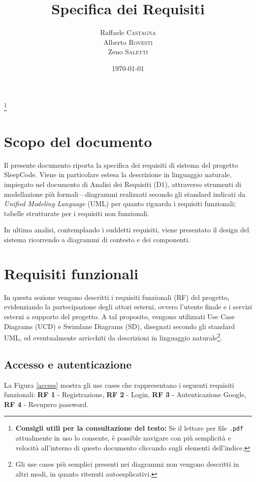 \documentclass[11pt, a4paper]{article}
\title{Specifica dei Requisiti}
\author{Raffaele \textsc{Castagna}\\
Alberto \textsc{Rovesti}\\
Zeno \textsc{Saletti}}
\date{\today}
\theoremstyle{definition} %
\newcommand\blfootnote[1]{%
  \begingroup
  \renewcommand\thefootnote{}\footnote{#1}%
  \addtocounter{footnote}{-1}%
  \endgroup
}
\begin{document}


\tableofcontents\blfootnote{\textbf{Consigli utili per la consultazione del testo:} Se il lettore per file \texttt{.pdf} attualmente in uso lo consente, è possible navigare con più semplicità e velocità all'interno di questo documento cliccando sugli elementi dell'indice.}

\afterpage{\cfoot{\thepage}}
\newpage
\section*{Scopo del documento}
Il presente documento riporta la specifica dei requisiti di sistema
del progetto SleepCode. Viene in particolare estesa la descrizione
in linguaggio naturale, impiegato nel documento di Analisi dei Requisiti
(D1), attraverso strumenti di modellazione più formali—diagrammi
realizzati secondo gli standard indicati da \textit{Unified Modeling Language}
(UML) per quanto riguarda i requisiti funzionali; tabelle strutturate
per i requisiti non funzionali.

In ultima analisi, contemplando i suddetti requisiti, viene presentato il
design del sistema ricorrendo a diagrammi di contesto e dei componenti.


\newpage
\section{Requisiti funzionali}
In questa sezione vengono descritti i requisiti funzionali (RF) del
progetto, evidenziando la partecipazione degli attori esterni, ovvero
l'utente finale e i servizi esterni a supporto del progetto. A tal
proposito, vengono utilizzati Use Case Diagrams (UCD) e Swimlane Diagrams (SD),
disegnati secondo gli standard UML, ed eventualmente arricchiti da
descrizioni in linguaggio naturale\footnote{Gli use cases più semplici
presenti nei diagrammi non vengono descritti in altri modi, in quanto ritenuti
autoesplicativi.}.

\subsection{Accesso e autenticazione}
La Figura \ref{access} mostra gli use cases che rappresentano i seguenti
requisiti funzionali: \textbf{RF 1} - Registrazione,
\textbf{RF 2} - Login, \textbf{RF 3} - Autenticazione Google, \textbf{RF 4} - Recupero
password.
\end{document}

